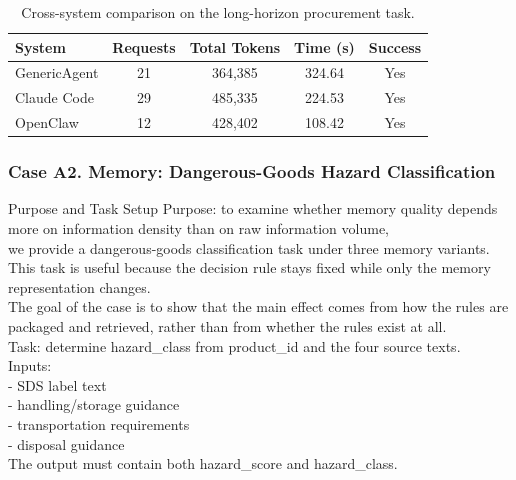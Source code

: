 \begin{table}[t]
\centering
\caption{Cross-system comparison on the long-horizon procurement task.}
\label{tab:appendix_tool_case}
\begin{tabular}{lcccc}
\toprule
\textbf{System} & \textbf{Requests} & \textbf{Total Tokens} & \textbf{Time (s)} & \textbf{Success} \\
\midrule
GenericAgent & 21 & 364,385 & 324.64 & Yes \\
Claude Code & 29 & 485,335 & 224.53 & Yes \\
OpenClaw & 12 & 428,402 & 108.42 & Yes \\
\bottomrule
\end{tabular}
\end{table}

\FloatBarrier

\subsubsection{Case A2. Memory: Dangerous-Goods Hazard Classification}
\label{app:case_memory}

\begin{CasePromptBox}{Purpose and Task Setup}
\small\ttfamily
Purpose: to examine whether memory quality depends more on information density than on raw information volume, \\
we provide a dangerous-goods classification task under three memory variants. \\
This task is useful because the decision rule stays fixed while only the memory representation changes. \\
The goal of the case is to show that the main effect comes from how the rules are packaged and retrieved, rather than from whether the rules exist at all. \\
Task: determine hazard\_class from product\_id and the four source texts. \\
Inputs: \\
- SDS label text \\
- handling/storage guidance \\
- transportation requirements \\
- disposal guidance \\
The output must contain both hazard\_score and hazard\_class.
\end{CasePromptBox}

